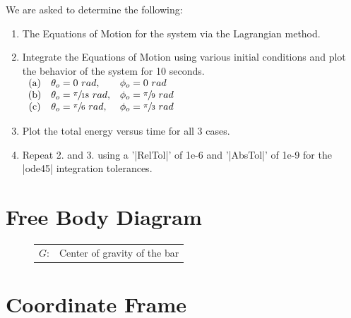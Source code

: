 \documentclass[12pt]{report}
\begin{document}
\begin{flushleft}
We are asked to determine the following: \\
\begin{enumerate}
  \item The Equations of Motion for the system via the Lagrangian method.
  \item Integrate the Equations of Motion using various initial conditions and plot
  the behavior of the system for 10 seconds. \\
  \vspace{2ex}
  $
  \begin{array}{cll}
    \text{(a)} & \theta_o = 0~rad, & \phi_o = 0~rad \\
    \text{(b)} & \theta_o = \sfrac{\pi}{18}~rad, & \phi_o = \sfrac{\pi}{9}~rad \\
    \text{(c)} & \theta_o = \sfrac{\pi}{6}~rad, & \phi_o = \sfrac{\pi}{3}~rad \\
  \end{array}
  $
  \item Plot the total energy versus time for all 3 cases.
  \item Repeat 2. and 3. using a '|RelTol|' of 1e-6 and '|AbsTol|' of 1e-9 for the
  |ode45| integration tolerances.
\end{enumerate}
\newpage
\section{Free Body Diagram}
\begin{figure}[!htp]
   \begin{minipage}[c]{.4\textwidth}
      
   \end{minipage}%
   \begin{minipage}[c]{.6\textwidth}
     \center
     \begin{tabular}{rl}
     $G$:&Center of gravity of the bar\\
   \end{tabular}
   \end{minipage}
\end{figure}
\section{Coordinate Frame} \label{section:coord}



\end{flushleft}
\end{document}
